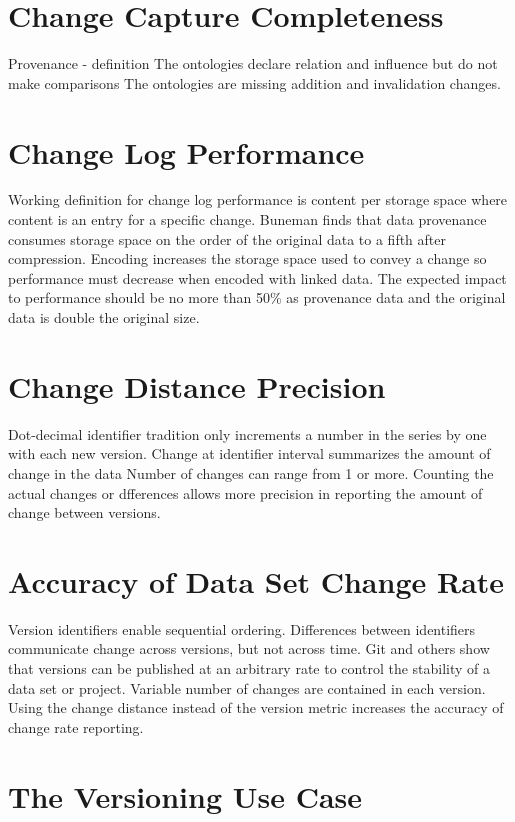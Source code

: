 \section{Change Capture Completeness}
Provenance - definition
The ontologies declare relation and influence but do not make comparisons
The ontologies are missing addition and invalidation changes.

\section{Change Log Performance}
Working definition for change log performance is content per storage space where content is an entry for a specific change.
Buneman finds that data provenance consumes storage space on the order of the original data to a fifth after compression.
Encoding increases the storage space used to convey a change so performance must decrease when encoded with linked data.
The expected impact to performance should be no more than 50\% as provenance data and the original data is double the original size.


\section{Change Distance Precision}
Dot-decimal identifier tradition only increments a number in the series by one with each new version.
Change at identifier interval summarizes the amount of change in the data
Number of changes can range from 1 or more.
Counting the actual changes or dfferences allows more precision in reporting the amount of change between versions.

\section{Accuracy of Data Set Change Rate}
Version identifiers enable sequential ordering.
Differences between identifiers communicate change across versions, but not across time.
Git and others show that versions can be published at an arbitrary rate to control the stability of a data set or project.
Variable number of changes are contained in each version.
Using the change distance instead of the version metric increases the accuracy of change rate reporting.

\section{The Versioning Use Case} \label{sec:usecase}

